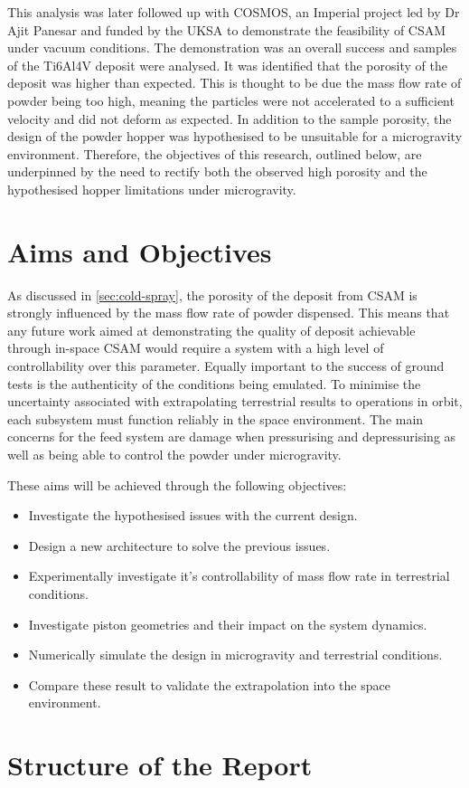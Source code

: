 This analysis was later followed up with COSMOS, an Imperial project led by Dr Ajit Panesar and funded by the UKSA to demonstrate the feasibility of CSAM under vacuum conditions. The demonstration was an overall success and samples of the Ti6Al4V deposit were analysed. It was identified that the porosity of the deposit was higher than expected. This is thought to be due the mass flow rate of powder being too high, meaning the particles were not accelerated to a sufficient velocity and did not deform as expected. In addition to the sample porosity, the design of the powder hopper was hypothesised to be unsuitable for a microgravity environment. Therefore, the objectives of this research, outlined below, are underpinned by the need to rectify both the observed high porosity and the hypothesised hopper limitations under microgravity.

\section{Aims and Objectives}
As discussed in \autoref{sec:cold-spray}, the porosity of the deposit from CSAM is strongly influenced by the mass flow rate of powder dispensed. This means that any future work aimed at demonstrating the quality of deposit achievable through in-space CSAM would require a system with a high level of controllability over this parameter. Equally important to the success of ground tests is the authenticity of the conditions being emulated. To minimise the uncertainty associated with extrapolating terrestrial results to operations in orbit, each subsystem must function reliably in the space environment. The main concerns for the feed system are damage when pressurising and depressurising as well as being able to control the powder under microgravity.

These aims will be achieved through the following objectives:
\begin{itemize}
    \item Investigate the hypothesised issues with the current design.
    \item Design a new architecture to solve the previous issues.
    \item Experimentally investigate it's controllability of mass flow rate in terrestrial conditions.
    \item Investigate piston geometries and their impact on the system dynamics.
    \item Numerically simulate the design in microgravity and terrestrial conditions.
    \item Compare these result to validate the extrapolation into the space environment. 
\end{itemize}


\section{Structure of the Report}
